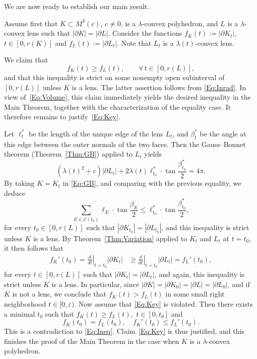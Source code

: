 \documentclass[12pt]{amsart}
\newcommand{\eps}{\varepsilon}
\renewcommand{\ge}{\geqslant}
\renewcommand{\le}{\leqslant}
\theoremstyle{theorem}
\theoremstyle{Intro}
\theoremstyle{definition}
\theoremstyle{remark}
\theoremstyle{claim}
\numberwithin{equation}{section}
\begin{document}
We are now ready to establish our main result. 

Assume first that $K \subset M^3(c)$, $c \neq 0$, is a $\lambda$-convex polyhedron, and $L$ is a $\lambda$-convex lens such that $|\partial K|=|\partial L|$. Consider the functions $f_K(t) := |\partial K_t|$, $t \in [0,r(K)]$ and $f_L(t) := |\partial L_t|$. Note that $L_t$ is a $\lambda(t)$-convex lens.

We claim that
\begin{equation}
\label{Eq:Key}
f_K(t) \ge f_L(t), \qquad \forall\, t \in [0,r(L)],
\end{equation}
and that this inequality is strict on some nonempty open subinterval of $[0,r(L)]$ unless $K$ is a lens. The latter assertion follows from \eqref{Eq:Inrad}. In view of~\eqref{Eq:Volume}, this claim immediately yields the desired inequality in the Main Theorem, together with the characterization of the equality case. It therefore remains to justify~\eqref{Eq:Key}.


Let $\ell^*_t$ be the length of the unique edge of the lens $L_t$, and $\beta^*_t$ be the angle at this edge between the outer normals of the two faces. Then the Gauss--Bonnet theorem (Theorem~\ref{Thm:GB}) applied to $L_t$ yields
\[
(\lambda(t)^2+c)|\partial L_t|+2\lambda(t) \ell_{t_0}^*\cdot\tan\frac{\beta_{t_0}^*}2=4\pi.
\]
By taking $K=K_t$ in \eqref{Eq:GB}, and comparing with the previous equality, we deduce
\begin{equation*}
    \sum_{E \in \mathcal E(t_0)} \ell_E \cdot \tan \frac{\beta_E}{2} \le 
    \ell^*_{t_0} \cdot \tan \frac{\beta^*_{t_0}}{2},
\end{equation*} 
for every $t_0 \in [0,r(L)]$ such that $|\partial K_{t_0}| = |\partial L_{t_0}|$, and this inequality is strict unless $K$ is a lens. By Theorem~\ref{Thm:Variation} applied to $K_t$ and $L_t$ at $t=t_0$, it then follows that
\begin{equation}
\label{Eq:Ineq}
\begin{aligned}
    f_K'(t_0) = \left.\frac{d}{dt}\right|_{t=t_0} |\partial K_t| &\ge 
    \left.\frac{d}{dt}\right|_{t=t_0} |\partial L_t| = f_L'(t_0),
\end{aligned}
    \end{equation}
    for every $t \in [0,r(L)]$ such that $|\partial K_t| = |\partial L_t|$, and again, this inequality is strict unless $K$ is a lens. In particular, since $|\partial K| = |\partial K_0| = |\partial L| = |\partial L_0|$, and if $K$ is not a lens, we conclude that $f_K(t) > f_L(t)$ in some small right neighborhood $t \in [0,\eps)$. Now assume that \eqref{Eq:Key} is violated. Then there exists a minimal $t_0$ such that $f_K(t) \ge f_L(t), \,\,t \in [0,t_0]$ and  
\[
f_K(t_0) = f_L(t_0), \quad f_K'(t_0) \le f_L'(t_0).
\]
This is a contradiction to \eqref{Eq:Ineq}. Claim~\eqref{Eq:Key} is thus justified, and this finishes the proof of the Main Theorem in the case when $K$ is a $\lambda$-convex polyhedron.
\end{document}
